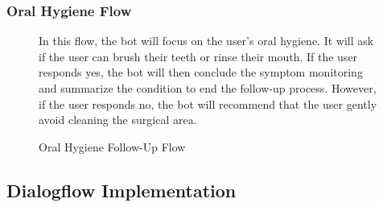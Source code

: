 \documentclass[12pt,oneside,openright,a4paper]{cpe-english-project}
\begin{document}
        \subsubsection{Oral Hygiene Flow}
          \begin{figure}[H]
            \centering
            \caption{Oral Hygiene Follow-Up Flow}\label{fig:FollowUpFlow6}
            \begin{justify}
              \qquad In this flow, the bot will focus on the user's oral hygiene. It will ask if the user can brush their teeth or rinse their mouth. If the user responds yes, the bot will then conclude the symptom monitoring and summarize the condition to end the follow-up process. However, if the user responds no, the bot will recommend that the user gently avoid cleaning the surgical area.\par
            \end{justify}        
          \end{figure}
      \subsection{Dialogflow Implementation}
\end{document}
